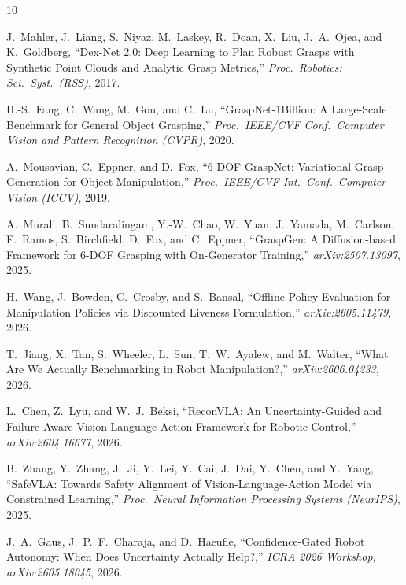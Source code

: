 \documentclass[journal]{IEEEtran}
\begin{document}
\begin{thebibliography}{10}

J.~Mahler, J.~Liang, S.~Niyaz, M.~Laskey, R.~Doan, X.~Liu, J.~A.~Ojea,
and K.~Goldberg,
``Dex-Net 2.0: Deep Learning to Plan Robust Grasps with Synthetic
  Point Clouds and Analytic Grasp Metrics,''
\emph{Proc.\ Robotics: Sci.\ Syst.\ (RSS)}, 2017.

H.-S.~Fang, C.~Wang, M.~Gou, and C.~Lu,
``GraspNet-1Billion: A Large-Scale Benchmark for General Object
  Grasping,''
\emph{Proc.\ IEEE/CVF Conf.\ Computer Vision and Pattern Recognition
  (CVPR)}, 2020.

A.~Mousavian, C.~Eppner, and D.~Fox,
``6-DOF GraspNet: Variational Grasp Generation for Object
  Manipulation,''
\emph{Proc.\ IEEE/CVF Int.\ Conf.\ Computer Vision (ICCV)}, 2019.

A.~Murali, B.~Sundaralingam, Y.-W.~Chao, W.~Yuan, J.~Yamada,
M.~Carlson, F.~Ramos, S.~Birchfield, D.~Fox, and C.~Eppner,
``GraspGen: A Diffusion-based Framework for 6-DOF Grasping with
  On-Generator Training,''
\emph{arXiv:2507.13097}, 2025.

H.~Wang, J.~Bowden, C.~Crosby, and S.~Bansal,
``Offline Policy Evaluation for Manipulation Policies via Discounted
  Liveness Formulation,''
\emph{arXiv:2605.11479}, 2026.

T.~Jiang, X.~Tan, S.~Wheeler, L.~Sun, T.~W.~Ayalew, and M.~Walter,
``What Are We Actually Benchmarking in Robot Manipulation?,''
\emph{arXiv:2606.04233}, 2026.

L.~Chen, Z.~Lyu, and W.~J.~Beksi,
``ReconVLA: An Uncertainty-Guided and Failure-Aware
  Vision-Language-Action Framework for Robotic Control,''
\emph{arXiv:2604.16677}, 2026.

B.~Zhang, Y.~Zhang, J.~Ji, Y.~Lei, Y.~Cai, J.~Dai, Y.~Chen, and
Y.~Yang,
``SafeVLA: Towards Safety Alignment of Vision-Language-Action Model
  via Constrained Learning,''
\emph{Proc.\ Neural Information Processing Systems (NeurIPS)}, 2025.

J.~A.~Gaus, J.~P.~F.~Charaja, and D.~Haeufle,
``Confidence-Gated Robot Autonomy: When Does Uncertainty Actually
  Help?,''
\emph{ICRA 2026 Workshop, arXiv:2605.18045}, 2026.


\end{thebibliography}
\end{document}
